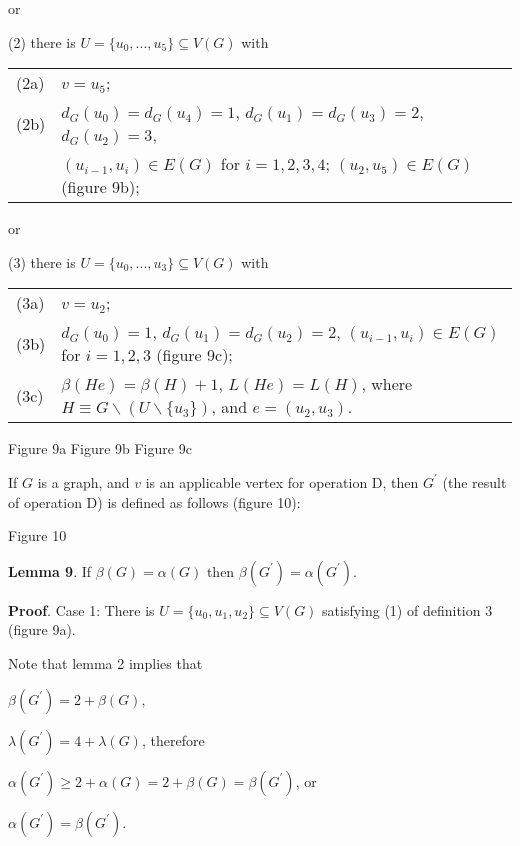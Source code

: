 \documentclass{article}
\begin{document}
or

(2) there is $U=\{u_{0},...,u_{5}\}\subseteq V(G)$ with

\qquad 
\begin{tabular}{ll}
(2a) & $v=u_{5}$; \\ 
(2b) & $d_{G}(u_{0})=d_{G}(u_{4})=1$, $d_{G}(u_{1})=d_{G}(u_{3})=2$, $d_{G}(u_{2})=3$, \\ 
& $(u_{i-1},u_{i})\in E(G)$ for $i=1,2,3,4$; $(u_{2},u_{5})\in E(G)$ (figure
9b);\end{tabular}

or

(3) there is $U=\{u_{0},...,u_{3}\}\subseteq V(G)$ with

\qquad 
\begin{tabular}{ll}
(3a) & $v=u_{2}$; \\ 
(3b) & $d_{G}(u_{0})=1$, $d_{G}(u_{1})=d_{G}(u_{2})=2$, $(u_{i-1},u_{i})\in
E(G)$ for $i=1,2,3$ (figure 9c); \\ 
(3c) & $\beta (He)=\beta (H)+1$, $L(He)=L(H)$, where $H\equiv G\backslash
(U\backslash \{u_{3}\})$, and $e=(u_{2},u_{3})$.\end{tabular}

\begin{center}

Figure 9a \qquad \qquad \qquad Figure 9b \qquad \qquad \qquad Figure
9c\bigskip
\end{center}

If $G$ is a graph, and $v$ is an applicable vertex for operation D, then $G^{\prime }$ (the result of operation D) is defined as follows (figure 10):

\begin{center}

Figure 10\bigskip
\end{center}

\textbf{Lemma 9}. If $\beta (G)=\alpha (G)$ then $\beta (G^{\prime })=\alpha
(G^{\prime })$.

\textbf{Proof}. Case 1: There is $U=\{u_{0},u_{1},u_{2}\}\subseteq V(G)$
satisfying (1) of definition 3 (figure 9a).

Note that lemma 2 implies that

\begin{center}
$\beta (G^{\prime })=2+\beta (G)$,

$\lambda (G^{\prime })=4+\lambda (G)$, therefore

$\alpha (G^{\prime })\geq 2+\alpha (G)=2+\beta (G)=\beta (G^{\prime })$, or

$\alpha (G^{\prime })=\beta (G^{\prime })$.
\end{center}
\end{document}
